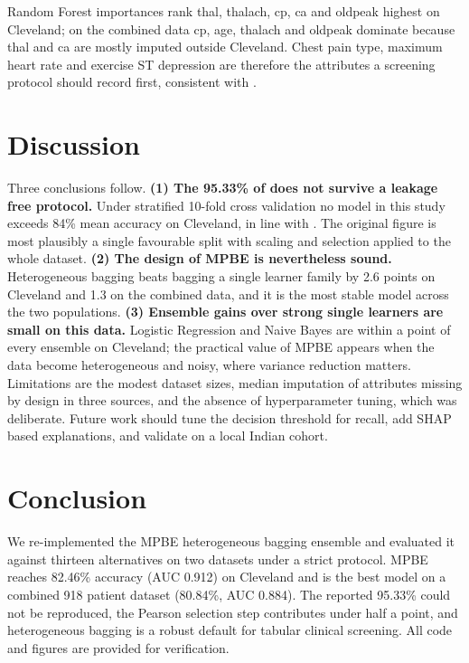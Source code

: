 \documentclass[runningheads]{llncs}
\begin{document}
Random Forest importances rank thal, thalach, cp, ca and oldpeak highest on Cleveland; on the combined data cp, age, thalach and oldpeak dominate because thal and ca are mostly imputed outside Cleveland. Chest pain type, maximum heart rate and exercise ST depression are therefore the attributes a screening protocol should record first, consistent with \cite{r15,r16}.

\section{Discussion}
Three conclusions follow. \textbf{(1) The 95.33\% of \cite{r1} does not survive a leakage free protocol.} Under stratified 10-fold cross validation no model in this study exceeds 84\% mean accuracy on Cleveland, in line with \cite{r8,r9,r10,r21}. The original figure is most plausibly a single favourable split with scaling and selection applied to the whole dataset. \textbf{(2) The design of MPBE is nevertheless sound.} Heterogeneous bagging beats bagging a single learner family by 2.6 points on Cleveland and 1.3 on the combined data, and it is the most stable model across the two populations. \textbf{(3) Ensemble gains over strong single learners are small on this data.} Logistic Regression and Naive Bayes are within a point of every ensemble on Cleveland; the practical value of MPBE appears when the data become heterogeneous and noisy, where variance reduction matters. Limitations are the modest dataset sizes, median imputation of attributes missing by design in three sources, and the absence of hyperparameter tuning, which was deliberate. Future work should tune the decision threshold for recall, add SHAP based explanations, and validate on a local Indian cohort.

\section{Conclusion}
We re-implemented the MPBE heterogeneous bagging ensemble and evaluated it against thirteen alternatives on two datasets under a strict protocol. MPBE reaches 82.46\% accuracy (AUC 0.912) on Cleveland and is the best model on a combined 918 patient dataset (80.84\%, AUC 0.884). The reported 95.33\% could not be reproduced, the Pearson selection step contributes under half a point, and heterogeneous bagging is a robust default for tabular clinical screening. All code and figures are provided for verification.
\end{document}
